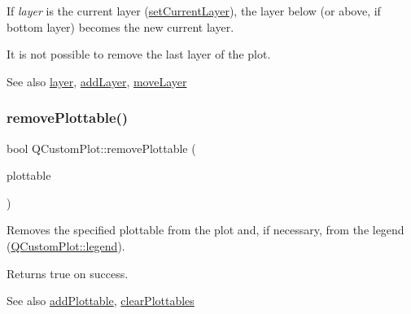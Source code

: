 If {\itshape layer} is the current layer (\mbox{\hyperlink{class_q_custom_plot_a73a6dc47c653bb6f8f030abca5a11852}{set\+Current\+Layer}}), the layer below (or above, if bottom layer) becomes the new current layer.

It is not possible to remove the last layer of the plot.

\begin{DoxySeeAlso}{See also}
\mbox{\hyperlink{class_q_custom_plot_a0a96244e7773b242ef23c32b7bdfb159}{layer}}, \mbox{\hyperlink{class_q_custom_plot_ad5255393df078448bb6ac83fa5db5f52}{add\+Layer}}, \mbox{\hyperlink{class_q_custom_plot_ae896140beff19424e9e9e02d6e331104}{move\+Layer}} 
\end{DoxySeeAlso}
\mbox{\label{class_q_custom_plot_af3dafd56884208474f311d6226513ab2}} 
\subsubsection{\texorpdfstring{remove\+Plottable()}{removePlottable()}\hspace{0.1cm}{\footnotesize\ttfamily [1/2]}}
{\footnotesize\ttfamily bool Q\+Custom\+Plot\+::remove\+Plottable (\begin{DoxyParamCaption}\item[{\mbox{\hyperlink{class_q_c_p_abstract_plottable}{Q\+C\+P\+Abstract\+Plottable}} $\ast$}]{plottable }\end{DoxyParamCaption})}

Removes the specified plottable from the plot and, if necessary, from the legend (\mbox{\hyperlink{class_q_custom_plot_a4eadcd237dc6a09938b68b16877fa6af}{Q\+Custom\+Plot\+::legend}}).

Returns true on success.

\begin{DoxySeeAlso}{See also}
\mbox{\hyperlink{class_q_custom_plot_ab7ad9174f701f9c6f64e378df77927a6}{add\+Plottable}}, \mbox{\hyperlink{class_q_custom_plot_a9a409bb3201878adb7ffba1c89c4e004}{clear\+Plottables}} 
\end{DoxySeeAlso}
\mbox{\label{class_q_custom_plot_afc210e0021480f8119bccf37839dbcc8}} 
